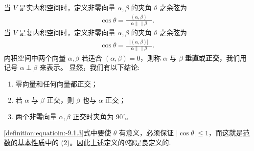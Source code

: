 \documentclass[../../main.tex]{subfiles}%
\begin{document}
\begin{definition}[向量的夹角]
当 \(V\) 是实内积空间时，定义非零向量 \(\alpha,\beta\) 的夹角 \(\theta\) 之余弦为
\begin{align}
\cos\theta=\frac{(\alpha,\beta)}{\|\alpha\|\|\beta\|}.\label{definition:equatioin:-9.1.3}
\end{align}
当 \(V\) 是复内积空间时，定义非零向量 \(\alpha,\beta\) 的夹角 \(\theta\) 之余弦为
\begin{align*}
\cos\theta=\frac{|(\alpha,\beta)|}{\|\alpha\|\|\beta\|}.
\end{align*}
内积空间中两个向量 \(\alpha,\beta\) 若适合 \((\alpha,\beta)=0\)，则称 \(\alpha\) 与 \(\beta\) \textbf{垂直}或\textbf{正交}，我们用记号 \(\alpha\perp\beta\) 来表示。
显然，我们有以下结论:
\begin{enumerate}
\item 零向量和任何向量都正交；

\item 若 \(\alpha\) 与 \(\beta\) 正交，则 \(\beta\) 也与 \(\alpha\) 正交；

\item 两个非零向量 \(\alpha,\beta\) 正交时夹角为 \(90^{\circ}\)。
\end{enumerate}
\end{definition}
\begin{remark}
\eqref{definition:equatioin:-9.1.3}式中要使 \(\theta\) 有意义，必须保证 \(|\cos\theta|\leqslant 1\)，而这就是\hyperref[theorem:范数的基本性质]{范数的基本性质}中的 (2)。因此上述定义的$\theta$都是良定义的.
\end{remark}
\end{document}
